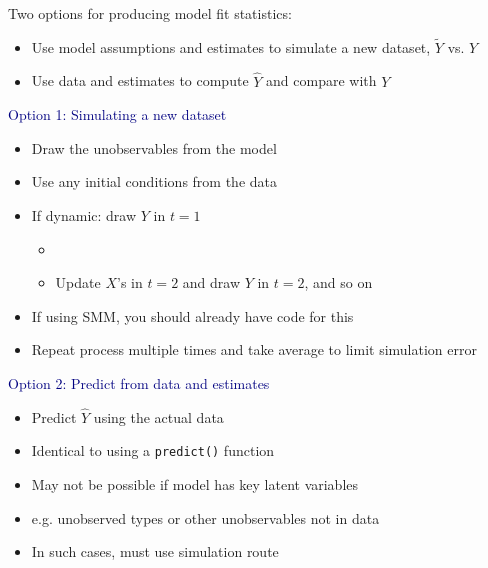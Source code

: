 \documentclass[aspectratio=169]{beamer}
\begin{document}
\begin{frame}

Two options for producing model fit statistics:

\bigskip{}

\begin{itemize}
\itemsep1.5em
\item<2-> Use model assumptions and estimates to simulate a new dataset, $\tilde{Y}$ vs. $Y$
\item<3-> Use data and estimates to compute $\hat{Y}$ and compare with $Y$
\end{itemize}

\end{frame}

\begin{frame}

\textcolor{navy}{Option 1: Simulating a new dataset}

\bigskip{}

\begin{itemize}
\itemsep1.5em
\item<2-> Draw the unobservables from the model
\item<3-> Use any initial conditions from the data
\item<4-> If dynamic: draw $Y$ in $t=1$
\begin{itemize}
    \item<5->[]
    \item<5-> Update $X$'s in $t=2$ and draw $Y$ in $t=2$, and so on
\end{itemize}
\item<6-> If using SMM, you should already have code for this
\item<7-> Repeat process multiple times and take average to limit simulation error
\end{itemize}

\end{frame}

\begin{frame}

\textcolor{navy}{Option 2: Predict from data and estimates}

\bigskip{}

\begin{itemize}
\itemsep1.5em
\item<2-> Predict $\hat{Y}$ using the actual data
\item<3-> Identical to using a \texttt{predict()} function
\item<4-> May not be possible if model has key latent variables
\item<5-> e.g. unobserved types or other unobservables not in data
\item<6-> In such cases, must use simulation route
\end{itemize}

\end{frame}
\end{document}
